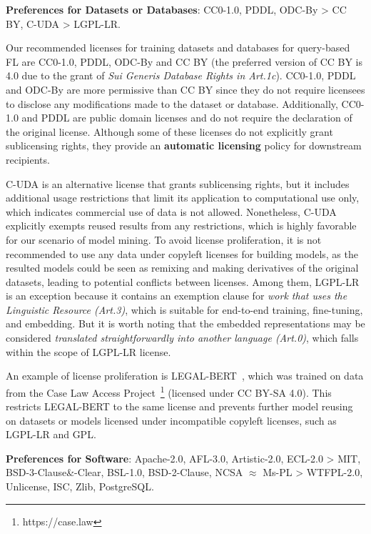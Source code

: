 \textbf{Preferences for Datasets or Databases}: CC0-1.0, PDDL, ODC-By > CC BY, C-UDA > LGPL-LR.
   
  Our recommended licenses for training datasets and databases for query-based FL are CC0-1.0, PDDL, ODC-By and CC BY (the preferred version of CC BY is 4.0 due to the grant of \textit{Sui Generis Database Rights in Art.1c}).
  CC0-1.0, PDDL and ODC-By are more permissive than CC BY since they do not require licensees to disclose any modifications made to the dataset or database. Additionally, CC0-1.0 and PDDL are public domain licenses and do not require the declaration of the original license.
  Although some of these licenses do not explicitly grant sublicensing rights, they provide an \textbf{automatic licensing} policy for downstream recipients.
  
  C-UDA is an alternative license that grants sublicensing rights, but it includes additional usage restrictions that limit its application to computational use only, which indicates commercial use of data is not allowed.
  Nonetheless, C-UDA explicitly exempts reused results from any restrictions, which is highly favorable for our scenario of model mining.
  To avoid license proliferation, it is not recommended to use any data under copyleft licenses for building models, as the resulted models could be seen as remixing and making derivatives of the original datasets, leading to potential conflicts between licenses.
  Among them, LGPL-LR is an exception because it contains an exemption clause for \textit{work that uses the Linguistic Resource (Art.3)}, which is suitable for end-to-end training, fine-tuning, and embedding. 
  But it is worth noting that the embedded representations may be considered \textit{translated straightforwardly into another language (Art.0)}, which falls within the scope of LGPL-LR license.
  
  An example of license proliferation is LEGAL-BERT~\cite{chalkidis2020legal}, which was trained on data from the Case Law Access Project~\footnote{https://case.law} (licensed under CC BY-SA 4.0). This restricts LEGAL-BERT to the same license and prevents further model reusing on datasets or models licensed under incompatible copyleft licenses, such as LGPL-LR and GPL.

  \textbf{Preferences for Software}: Apache-2.0, AFL-3.0, Artistic-2.0, ECL-2.0 > MIT, BSD-3-Clause\&-Clear, BSL-1.0, BSD-2-Clause, NCSA $\approx$ Ms-PL > WTFPL-2.0, Unlicense, ISC, Zlib, PostgreSQL.
  
